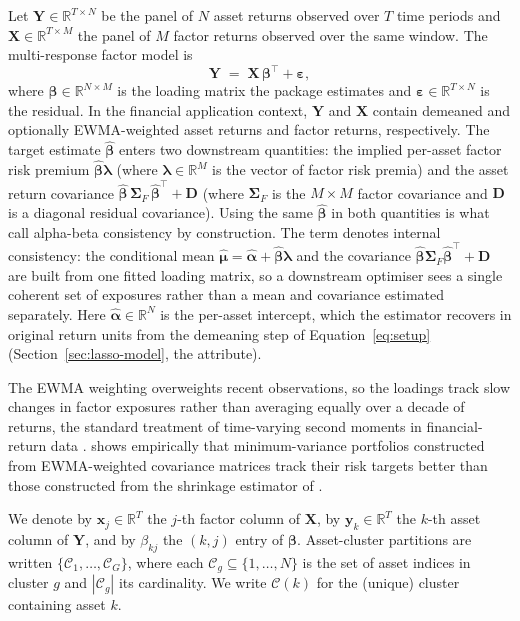 \documentclass[article]{jss}
\begin{document}
Let $\bm{Y} \in \mathbb{R}^{T \times N}$ be the panel of $N$ asset
returns observed over $T$ time periods and
$\bm{X} \in \mathbb{R}^{T \times M}$ the panel of $M$ factor returns
observed over the same window. The multi-response factor model is
%
\begin{equation} \label{eq:setup}
\bm{Y} \;=\; \bm{X}\, \bm{\beta}^\top + \bm{\varepsilon},
\end{equation}
%
where $\bm{\beta} \in \mathbb{R}^{N \times M}$ is the loading matrix
the package estimates and $\bm{\varepsilon}\in \mathbb{R}^{T \times N}$ is the residual.
In the financial application context, $\bm{Y}$ and $\bm{X}$ contain demeaned and
optionally EWMA-weighted asset returns and factor returns, respectively. The
target estimate $\hat{\bm{\beta}}$ enters two downstream quantities:
the implied per-asset factor risk premium $\hat{\bm{\beta}}\bm{\lambda}$
(where $\bm{\lambda} \in \mathbb{R}^M$ is the vector of factor risk
premia) and the asset return covariance
$\hat{\bm{\beta}}\, \bm{\Sigma}_F\, \hat{\bm{\beta}}^\top + \bm{D}$
(where $\bm{\Sigma}_F$ is the $M \times M$ factor covariance and
$\bm{D}$ is a diagonal residual covariance).  Using the same
$\hat{\bm{\beta}}$ in both quantities is what
\cite{Sepp+Hansen+Kastenholz:2026MATF} call alpha-beta consistency by
construction. The term denotes internal consistency: the conditional
mean $\hat{\bm{\mu}} = \hat{\bm{\alpha}} + \hat{\bm{\beta}}
\bm{\lambda}$ and the covariance $\hat{\bm{\beta}} \bm{\Sigma}_F
\hat{\bm{\beta}}^\top + \bm{D}$ are built from one fitted loading
matrix, so a downstream optimiser sees a single coherent set of
exposures rather than a mean and covariance estimated separately. Here
$\hat{\bm{\alpha}} \in \mathbb{R}^N$ is the per-asset intercept, which
the estimator recovers in original return units from the demeaning step
of Equation~\ref{eq:setup} (Section~\ref{sec:lasso-model}, the
 attribute).

The EWMA weighting
overweights recent observations, so the loadings track slow changes in
factor exposures rather than averaging equally over a decade of
returns, the standard treatment of time-varying second moments in
financial-return data \citep{Engle:2002}. \cite{Zakamulin:2015} shows
empirically that minimum-variance portfolios constructed from
EWMA-weighted covariance matrices track their risk targets better than
those constructed from the shrinkage estimator of
\cite{Ledoit+Wolf:2004}.


We denote by $\bm{x}_j \in \mathbb{R}^T$ the $j$-th factor column of
$\bm{X}$, by $\bm{y}_k \in \mathbb{R}^T$ the $k$-th asset column of
$\bm{Y}$, and by $\beta_{kj}$ the $(k,j)$ entry of $\bm{\beta}$.
Asset-cluster partitions are written
$\{\mathcal{C}_1, \ldots, \mathcal{C}_G\}$, where each
$\mathcal{C}_g \subseteq \{1, \ldots, N\}$ is the set of asset indices in
cluster $g$ and $|\mathcal{C}_g|$ its cardinality. We write
$\mathcal{C}(k)$ for the (unique) cluster containing asset $k$.
\end{document}
